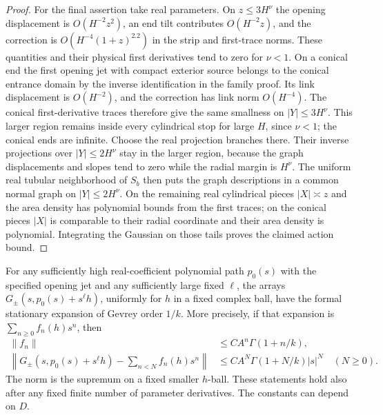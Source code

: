 \begin{proof}
For the final assertion take real parameters.  On $z\le3H^\nu$ the
opening displacement is $O(H^{-2}z^2)$, an end tilt contributes
$O(H^{-2}z)$, and the correction is $O(H^{-4}(1+z)^{2.2})$ in the
strip and first-trace norms.  These quantities and their physical first
derivatives tend to zero for $\nu<1$.  On a conical end the first opening
jet with compact exterior source belongs to the conical entrance domain
by the inverse identification in the family proof.  Its link displacement
is $O(H^{-2})$, and the correction has link norm $O(H^{-4})$.
The conical first-derivative traces therefore give the same smallness
on $|Y|\le3H^\nu$.  This larger region remains inside every cylindrical
stop for large $H$, since $\nu<1$; the conical ends are infinite.
Choose the real projection branches there.  Their inverse projections
over $|Y|\le2H^\nu$ stay in the larger region, because the graph
displacements and slopes tend to zero while the radial margin is $H^\nu$.
The uniform real tubular neighborhood of $S_b$ then puts the graph
descriptions in a common normal graph on $|Y|\le2H^\nu$.
On the remaining real cylindrical
pieces $|X|\asymp z$ and the area density has polynomial bounds from
the first traces; on the conical pieces $|X|$ is comparable to their
radial coordinate and their area density is polynomial.  Integrating
the Gaussian on those tails proves the claimed action bound.
\end{proof}

\begin{lemma}\label{arr:gevrey}
For any sufficiently high real-coefficient polynomial path \(p_0(s)\) with the
specified opening jet and any sufficiently large fixed \(\ell\),
the arrays \(G_\pm(s,p_0(s)+s^\ell h)\), uniformly for \(h\)
in a fixed complex ball, have the formal stationary expansion
of Gevrey order \(1/k\).  More precisely, if that expansion is
\(\sum_{n\ge0}f_n(h)s^n\), then
\begin{align}
 \|f_n\|&\le C A^n\Gamma(1+n/k),\label{arr:gevrey-coeff}\\
 \left\|G_\pm(s,p_0(s)+s^\ell h)
      -\sum_{n<N}f_n(h)s^n\right\|
   &\le C A^N\Gamma(1+N/k)|s|^N
       \quad(N\ge0).\label{arr:gevrey-remainder}
\end{align}
The norm is the supremum on a fixed smaller \(h\)-ball.
These statements hold also after any fixed finite number
of parameter derivatives.  The constants can depend on \(D\).
\end{lemma}

